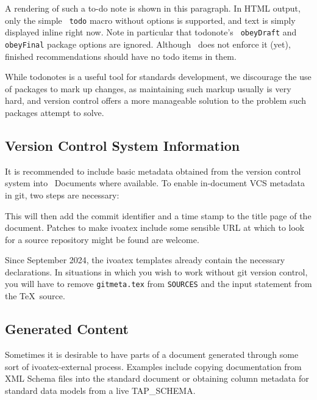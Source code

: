 \documentclass[11pt,a4paper]{ivoa}
\newcommand{\texword}[1]{\texttt{\color{texcolor} #1}}
\begin{document}
A rendering of such a to-do note is shown in this
paragraph. In HTML output,
only the simple \texword{todo} macro without options is supported, and
text is simply displayed inline right now.  Note in particular that
todonote's \texword{obeyDraft} and \texword{obeyFinal} package options
are ignored.  Although \ivoatex\ does not enforce it (yet), finished
recommendations should have no todo items in them.

While todonotes is a useful tool for standards development, we
discourage the use of packages to mark up changes, as maintaining such
markup usually is very hard, and version control offers a more
manageable solution to the problem such packages attempt to solve.

\subsection{Version Control System Information}
\label{sect:vcs}

It is recommended to include basic metadata obtained from the version
control system into \ivoatex~Documents where available.
To enable in-document VCS metadata in git, two steps are necessary:


This will then add the commit identifier and a time stamp to the title
page of the document.  Patches to make ivoatex include some sensible URL
at which to look for a source repository might be found are welcome.

Since September 2024, the ivoatex templates already contain the
necessary declarations.  In situations in which you wish to work without
git version control, you will have to remove \verb|gitmeta.tex| from
\verb|SOURCES| and the input statement from the \TeX~source.

\subsection{Generated Content}
\label{sect:generated}

Sometimes it is desirable to have parts of a document generated through
some sort of ivoatex-external process.  Examples include copying
documentation from XML Schema files into the standard document
or obtaining column metadata for standard
data models from a live TAP\_SCHEMA.
\end{document}
